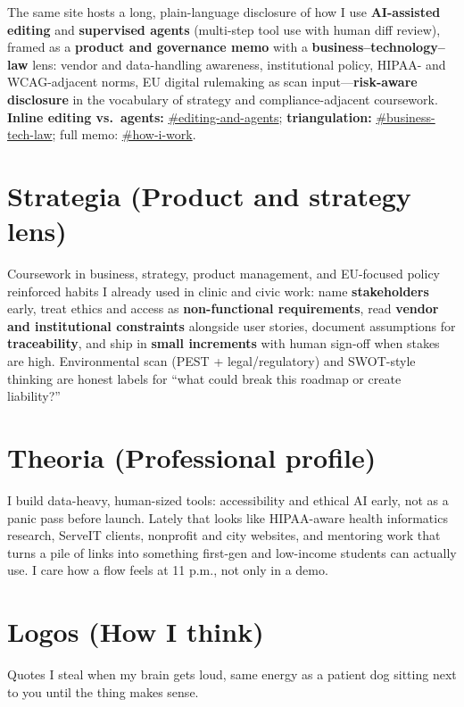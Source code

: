 \documentclass[11pt]{article}
\begin{document}
\noindent The same site hosts a long, plain-language disclosure of how I use \textbf{AI-assisted editing} and \textbf{supervised agents} (multi-step tool use with human diff review), framed as a \textbf{product and governance memo} with a \textbf{business--technology--law} lens: vendor and data-handling awareness, institutional policy, HIPAA- and WCAG-adjacent norms, EU digital rulemaking as scan input---\textbf{risk-aware disclosure} in the vocabulary of strategy and compliance-adjacent coursework. \textbf{Inline editing vs.\ agents:} \href{https://jadexzhao.github.io/jadexzhao/how-i-work.html\#editing-and-agents}{\#editing-and-agents}; \textbf{triangulation:} \href{https://jadexzhao.github.io/jadexzhao/how-i-work.html\#business-tech-law}{\#business-tech-law}; full memo: \href{https://jadexzhao.github.io/jadexzhao/how-i-work.html\#how-i-work}{\#how-i-work}.

\section*{Strategia (Product and strategy lens)}
Coursework in business, strategy, product management, and EU-focused policy reinforced habits I already used in clinic and civic work: name \textbf{stakeholders} early, treat ethics and access as \textbf{non-functional requirements}, read \textbf{vendor and institutional constraints} alongside user stories, document assumptions for \textbf{traceability}, and ship in \textbf{small increments} with human sign-off when stakes are high. Environmental scan (PEST + legal/regulatory) and SWOT-style thinking are honest labels for ``what could break this roadmap or create liability?''

\section*{Theoria (Professional profile)}
I build data-heavy, human-sized tools: accessibility and ethical AI early, not as a panic pass before launch. Lately that looks like HIPAA-aware health informatics research, ServeIT clients, nonprofit and city websites, and mentoring work that turns a pile of links into something first-gen and low-income students can actually use. I care how a flow feels at 11 p.m., not only in a demo.

\section*{Logos (How I think)}
Quotes I steal when my brain gets loud, same energy as a patient dog sitting next to you until the thing makes sense.
\end{document}
